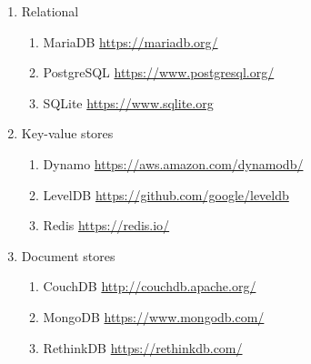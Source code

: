 \documentclass{textile}
\begin{document}
\begin{enumerate}
	\item Relational
    \begin{enumerate}
        \item MariaDB \url{https://mariadb.org/}
    	\item PostgreSQL \url{https://www.postgresql.org/}
        \item SQLite \url{https://www.sqlite.org}
    \end{enumerate}
    \item Key-value stores
    \begin{enumerate}
        \item Dynamo \url{https://aws.amazon.com/dynamodb/}
    	\item LevelDB \url{https://github.com/google/leveldb}
        \item Redis \url{https://redis.io/}
    \end{enumerate}
    \item Document stores
    \begin{enumerate}
        \item CouchDB \url{http://couchdb.apache.org/}
    	\item MongoDB \url{https://www.mongodb.com/}
        \item RethinkDB \url{https://rethinkdb.com/}
    \end{enumerate}
\end{enumerate} 
\end{document}
